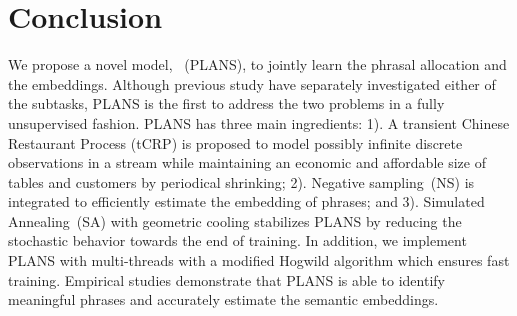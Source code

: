 \section{Conclusion}

We propose a novel model, \PLANS{}~(PLANS), to jointly learn the phrasal
allocation and the embeddings. Although previous study have separately
investigated either of the subtasks, PLANS is the first to
address the two problems in a fully unsupervised fashion. PLANS has three main
ingredients: 1). A transient Chinese Restaurant Process (tCRP) is proposed to
model possibly infinite discrete observations in a stream while maintaining an
economic and affordable size of tables and customers by periodical shrinking;
2). Negative sampling~(NS) is integrated to efficiently estimate the
embedding of phrases; and 3). Simulated Annealing~(SA) with geometric cooling
stabilizes PLANS by reducing the stochastic behavior towards the end of
training. In addition, we implement PLANS with multi-threads with a modified
Hogwild algorithm which ensures fast training. Empirical studies demonstrate
that PLANS is able to identify meaningful phrases and accurately estimate the semantic
embeddings.
